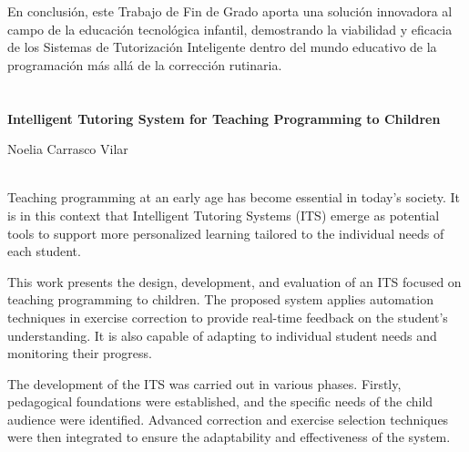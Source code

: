En conclusión, este Trabajo de Fin de Grado aporta una solución innovadora al campo de la educación tecnológica infantil, demostrando la viabilidad y eficacia de los Sistemas de Tutorización Inteligente dentro del mundo educativo de la programación más allá de la corrección rutinaria.



\chapter*{}
\thispagestyle{empty}

\begin{center}

{\large\bfseries Intelligent Tutoring System for Teaching Programming to Children}\\[1cm]

\end{center}

\begin{center}

Noelia Carrasco Vilar\\

\end{center}

\vspace{0.5cm}
\vspace{0.5cm}

\\

Teaching programming at an early age has become essential in today's society. It is in this context that Intelligent Tutoring Systems (ITS) emerge as potential tools to support more personalized learning tailored to the individual needs of each student.

This work presents the design, development, and evaluation of an ITS focused on teaching programming to children. The proposed system applies automation techniques in exercise correction to provide real-time feedback on the student's understanding. It is also capable of adapting to individual student needs and monitoring their progress.

The development of the ITS was carried out in various phases. Firstly, pedagogical foundations were established, and the specific needs of the child audience were identified. Advanced correction and exercise selection techniques were then integrated to ensure the adaptability and effectiveness of the system.

